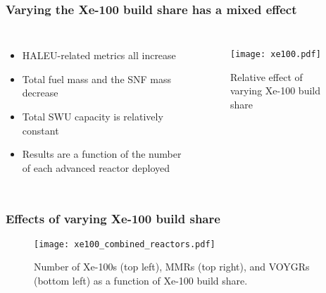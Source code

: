 \begin{frame}
    \frametitle{Varying the Xe-100 build share has a mixed effect}
    \begin{columns}

        \column[t]{4.5cm}
        \begin{itemize}
            \item HALEU-related metrics all increase
            \item Total fuel mass and the SNF mass decrease
            \item Total SWU capacity is relatively constant
            \item Results are a function of the number of
                  each advanced reactor deployed
        \end{itemize}

    \column[t]{5.5cm}
    \begin{figure}
        \centering 
            \texttt{[image: xe100.pdf]}
            \caption{Relative effect of varying Xe-100 build share}
            \label{fig:xe100_effects}
    \end{figure}

\end{columns}
\end{frame}

\begin{frame}
    \frametitle{Effects of varying Xe-100 build share}
    \begin{figure}
        \centering
        \texttt{[image: xe100\_combined\_reactors.pdf]}
        \caption{Number of Xe-100s (top left), MMRs (top right), and VOYGRs
        (bottom left) as a function of Xe-100 build share.}
        \label{fig:xe100_s7_combined_reactors}
    \end{figure}
\end{frame}

